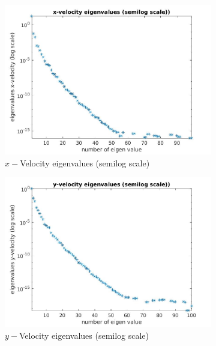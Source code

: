 \documentclass[graybox]{svmult}
\begin{document}
\begin{figure}[H]
\begin{subfigure}{0.31\textwidth}
\includegraphics[width=\linewidth]{x_velocity_eigen_value_semilog.jpg}
\caption{$x-$Velocity eigenvalues (semilog scale)} \label{vel_x_ev}
\end{subfigure}\hspace*{\fill}
\begin{subfigure}{0.31\textwidth}
\includegraphics[width=\linewidth]{y_velocity_eigen_value_semilog.jpg}
\caption{$y-$Velocity eigenvalues (semilog scale)} \label{vel_y_ev}
\end{subfigure}
\begin{subfigure}{0.31\textwidth}

\end{subfigure}
\end{figure}
\end{document}
